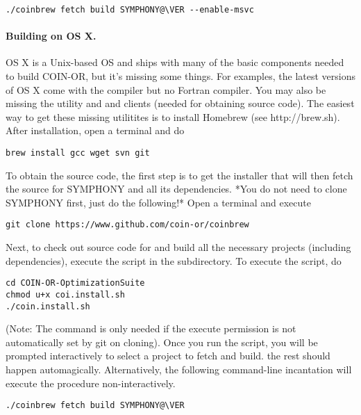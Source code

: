 {\color{brown}
\begin{verbatim}
./coinbrew fetch build SYMPHONY@\VER --enable-msvc
\end{verbatim}
}

\paragraph{Building on OS X.}

OS X is a Unix-based OS and ships with many of the basic components needed to
build COIN-OR, but it's missing some things. For examples, the latest versions
of OS X come with the  compiler but no Fortran compiler. You may also
be missing the  utility and  and  clients (needed for
obtaining source code). The easiest way to get these missing utilitites is to
install Homebrew (see http://brew.sh). After installation, open a terminal and
do

{\color{brown}
\begin{verbatim}
brew install gcc wget svn git
\end{verbatim}
}

To obtain the source code, the first step is to get the installer that will then
fetch the source for SYMPHONY and all its dependencies. *You do not need to
clone SYMPHONY first, just do the following!* Open a terminal and execute

{\color{brown}
\begin{verbatim}
git clone https://www.github.com/coin-or/coinbrew
\end{verbatim}
}

Next, to check out source code for and build all the necessary projects
(including dependencies), execute the script in the 
subdirectory. To execute the script, do

{\color{brown}
\begin{verbatim}
cd COIN-OR-OptimizationSuite
chmod u+x coi.install.sh
./coin.install.sh
\end{verbatim}
}

(Note: The  command is only needed if the execute permission is not
automatically set by git on cloning). Once you run the script,
you will be prompted interactively to select a project to fetch and build. the
rest should happen automagically. Alternatively, the following command-line
incantation will execute the procedure non-interactively.

{\color{brown}
\begin{verbatim}
./coinbrew fetch build SYMPHONY@\VER
\end{verbatim}
}

